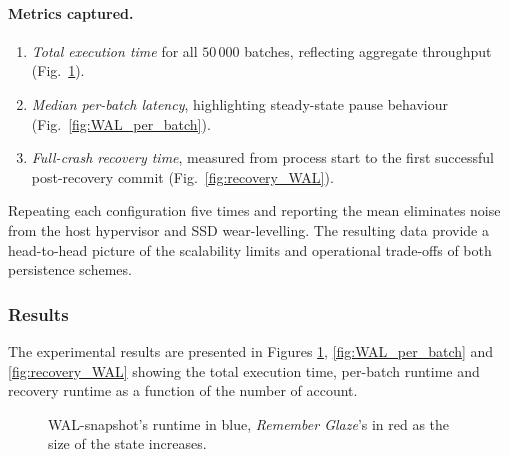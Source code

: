 \documentclass[conference]{IEEEtran}
\begin{document}
\paragraph{Metrics captured.}
\vspace{-0.2em}
\begin{enumerate}
  \item \emph{Total execution time} for all \(50\,000\) batches, reflecting
        aggregate throughput (Fig.~\ref{fig:WAL_exec}).
  \item \emph{Median per-batch latency}, highlighting steady-state pause
        behaviour (Fig.~\ref{fig:WAL_per_batch}).
  \item \emph{Full-crash recovery time}, measured from process start to the
        first successful post-recovery commit
        (Fig.~\ref{fig:recovery_WAL}).
\end{enumerate}

Repeating each configuration five times and reporting the mean eliminates
noise from the host hypervisor and SSD wear-levelling.  The resulting data
provide a head-to-head picture of the scalability limits and operational
trade-offs of both persistence schemes.

\subsubsection{Results}

The experimental results are presented in Figures \ref{fig:WAL_exec}, \ref{fig:WAL_per_batch} and \ref{fig:recovery_WAL} showing the total execution time, per-batch runtime and recovery runtime as a function of the number of account.
\begin{figure}[H] 
\centering
{}
\caption{ WAL-snapshot's runtime in blue, \textit{Remember Glaze}'s in red as the size of the state increases.}
\label{fig:WAL_exec}
\end{figure}
\end{document}
